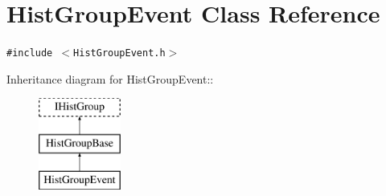 \hypertarget{classHistGroupEvent}{
\section{Hist\-Group\-Event Class Reference}
\label{classHistGroupEvent}
}
{\tt \#include $<$Hist\-Group\-Event.h$>$}

Inheritance diagram for Hist\-Group\-Event::\begin{figure}[H]
\begin{center}
\leavevmode
\includegraphics[height=3cm]{classHistGroupEvent}
\end{center}
\end{figure}
